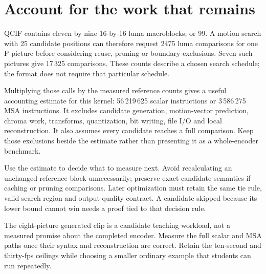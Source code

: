 \section{Account for the work that remains}
QCIF contains eleven by nine 16-by-16 luma macroblocks, or 99. A motion search
with 25 candidate positions can therefore request 2475 luma comparisons for one
P-picture before considering reuse, pruning or boundary exclusions. Seven such
pictures give 17\,325 comparisons. These counts describe a chosen search schedule;
the format does not require that particular schedule.

Multiplying those calls by the measured reference counts gives a useful accounting
estimate for this kernel: 56\,219\,625 scalar instructions or 3\,586\,275 MSA
instructions. It excludes candidate generation, motion-vector prediction, chroma
work, transforms, quantization, bit writing, file I/O and local reconstruction.
It also assumes every candidate reaches a full comparison. Keep those exclusions
beside the estimate rather than presenting it as a whole-encoder benchmark.

Use the estimate to decide what to measure next. Avoid recalculating an unchanged
reference block unnecessarily; preserve exact candidate semantics if caching or
pruning comparisons. Later optimization must retain the same tie rule, valid
search region and output-quality contract. A candidate skipped because its lower
bound cannot win needs a proof tied to that decision rule.

The eight-picture generated clip is a candidate teaching workload, not a measured
promise about the completed encoder. Measure the full scalar and MSA paths once
their syntax and reconstruction are correct. Retain the ten-second and thirty-fps
ceilings while choosing a smaller ordinary example that students can run repeatedly.
